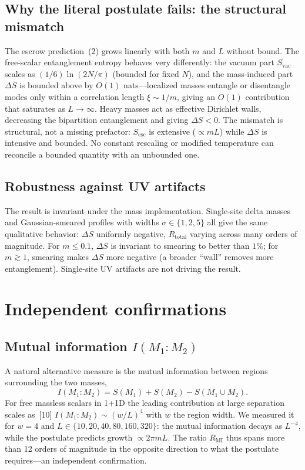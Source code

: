 \documentclass[11pt]{article}
\newcommand{\Sesc}{S_{\mathrm{esc}}}
\newcommand{\Svac}{S_{\mathrm{vac}}}
\newcommand{\Rtot}{R_{\mathrm{total}}}
\begin{document}
\subsection{Why the literal postulate fails: the structural mismatch}
The escrow prediction~(2) grows linearly with both $m$ and $L$ without bound. The free-scalar
entanglement entropy behaves very differently: the vacuum part $\Svac$ scales as $(1/6)\ln(2N/\pi)$
(bounded for fixed $N$), and the mass-induced part $\Delta S$ is bounded above by $O(1)$ nats---localized
masses entangle or disentangle modes only within a correlation length $\xi\sim 1/m$, giving an $O(1)$
contribution that saturates as $L\to\infty$. Heavy masses act as effective Dirichlet walls, decreasing
the bipartition entanglement and giving $\Delta S < 0$. The mismatch is structural, not a missing
prefactor: $\Sesc$ is extensive ($\propto mL$) while $\Delta S$ is intensive and bounded. No constant
rescaling or modified temperature can reconcile a bounded quantity with an unbounded one.

\subsection{Robustness against UV artifacts}
The result is invariant under the mass implementation. Single-site delta masses and Gaussian-smeared
profiles with widths $\sigma \in \{1,2,5\}$ all give the same qualitative behavior: $\Delta S$ uniformly
negative, $\Rtot$ varying across many orders of magnitude. For $m\le 0.1$, $\Delta S$ is invariant to
smearing to better than $1\%$; for $m\gtrsim 1$, smearing makes $\Delta S$ more negative (a broader
``wall'' removes more entanglement). Single-site UV artifacts are not driving the result.

\section{Independent confirmations}
\subsection{Mutual information $I(M_{1}{:}M_{2})$}
A natural alternative measure is the mutual information between regions surrounding the two masses,
\begin{equation}
  I(M_{1}{:}M_{2}) = S(M_{1}) + S(M_{2}) - S(M_{1}\cup M_{2}).
\end{equation}
For free massless scalars in 1+1D the leading contribution at large separation scales as~[10]
$I(M_{1}{:}M_{2}) \sim (w/L)^{4}$ with $w$ the region width. We measured it for $w=4$ and
$L \in \{10,20,40,80,160,320\}$: the mutual information decays as $L^{-4}$, while the postulate predicts
growth $\propto 2\pi m L$. The ratio $R_{\mathrm{MI}}$ thus spans more than 12 orders of magnitude in
the opposite direction to what the postulate requires---an independent confirmation.
\end{document}
